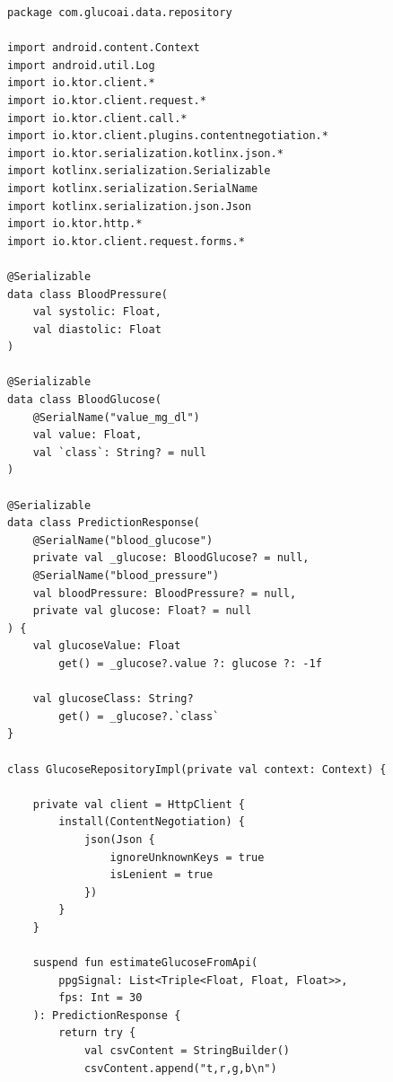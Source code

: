 \vspace{1.5em}
\begin{center}
    \begin{minipage}{\textwidth}
        \centering
        \label{lst:ktor_repo}
        \vspace{-0.5em}
    \end{minipage}
\end{center}
\begin{verbatim}
package com.glucoai.data.repository

import android.content.Context
import android.util.Log
import io.ktor.client.*
import io.ktor.client.request.*
import io.ktor.client.call.*
import io.ktor.client.plugins.contentnegotiation.*
import io.ktor.serialization.kotlinx.json.*
import kotlinx.serialization.Serializable
import kotlinx.serialization.SerialName
import kotlinx.serialization.json.Json
import io.ktor.http.*
import io.ktor.client.request.forms.*

@Serializable
data class BloodPressure(
    val systolic: Float,
    val diastolic: Float
)

@Serializable
data class BloodGlucose(
    @SerialName("value_mg_dl")
    val value: Float,
    val `class`: String? = null
)

@Serializable
data class PredictionResponse(
    @SerialName("blood_glucose")
    private val _glucose: BloodGlucose? = null,
    @SerialName("blood_pressure")
    val bloodPressure: BloodPressure? = null,
    private val glucose: Float? = null
) {
    val glucoseValue: Float
        get() = _glucose?.value ?: glucose ?: -1f
        
    val glucoseClass: String?
        get() = _glucose?.`class`
}

class GlucoseRepositoryImpl(private val context: Context) {

    private val client = HttpClient {
        install(ContentNegotiation) {
            json(Json {
                ignoreUnknownKeys = true
                isLenient = true
            })
        }
    }

    suspend fun estimateGlucoseFromApi(
        ppgSignal: List<Triple<Float, Float, Float>>,
        fps: Int = 30
    ): PredictionResponse {
        return try {
            val csvContent = StringBuilder()
            csvContent.append("t,r,g,b\n")
            

\end{verbatim}
